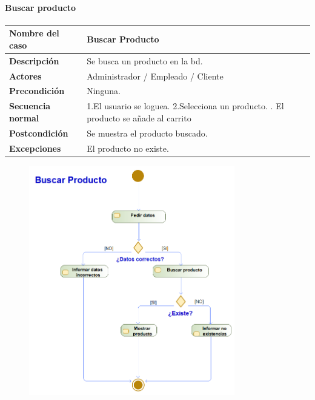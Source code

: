 \paragraph{Buscar producto}
\begin{table}[H]
	\centering
	\small
	\begin{tabularx}{0.8\textwidth}{|p{3.5cm}|X|}
		\hline
		\rowcolor{lightgray}
		\textbf{Nombre del caso}  & \textbf{Buscar Producto}             \\
		\hline
		\textbf{Descripción}      & Se busca un producto en la \gls{bd}. \\
		\hline
		\textbf{Actores}          & Administrador / Empleado / Cliente   \\
		\hline
		\textbf{Precondición}     & Ninguna.                             \\
		\hline
		\textbf{Secuencia normal} & 1.El usuario se loguea. \newline
		2.Selecciona un producto. \newline
		3. El producto se añade al carrito                               \\
		\hline
		\textbf{Postcondición}    & Se muestra el producto buscado.      \\
		\hline
		\textbf{Excepciones}      & El producto no existe.               \\
		\hline
	\end{tabularx}
\end{table}
\begin{figure}[H]
	\centering
	\includegraphics[width=0.8\textwidth]{Use_Cases/ProyectoIS_BuscarProducto.png}
\end{figure}
\newpage
